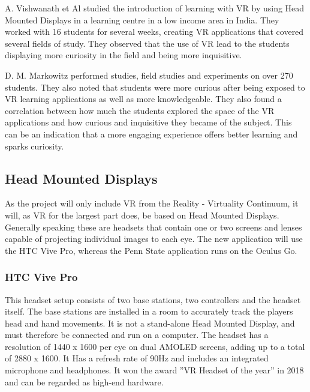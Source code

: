             A. Vishwanath et Al \cite{vr_low_income} studied the introduction of learning with VR by using Head Mounted Displays in a learning centre in a low income area in India. They worked with 16 students for several weeks, creating VR applications that covered several fields of study. They observed that the use of VR lead to the students displaying more curiosity in the field and being more inquisitive.
            
            D. M. Markowitz \cite{virtual_field_trips_learning} performed studies, field studies and experiments on over 270 students. They also noted that students were more curious after being exposed to VR learning applications as well as more knowledgeable. They also found a correlation between how much the students explored the space of the VR applications and how curious and inquisitive they became of the subject. This can be an indication that a more engaging experience offers better learning and sparks curiosity.
        
        \subsection{Head Mounted Displays}
            As the project will only include VR from the Reality - Virtuality Continuum, it will, as VR for the largest part does, be based on Head Mounted Displays. Generally speaking these are headsets that contain one or two screens and lenses capable of projecting individual images to each eye. The new application will use the HTC Vive Pro, whereas the Penn State application runs on the Oculus Go.
                
                \subsubsection{HTC Vive Pro}
                    This headset setup consists of two base stations, two controllers and the headset itself. The base stations are installed in a room to accurately track the players head and hand movements. It is not a stand-alone Head Mounted Display, and must therefore be connected and run on a computer. The headset has a resolution of 1440 x 1600 per eye on dual AMOLED screens, adding up to a total of 2880 x 1600. It Has a refresh rate of 90Hz and includes an integrated microphone and headphones. It won the award ''VR Headset of the year'' in 2018 and can be regarded as high-end hardware. \cite{vive_pro}
                    
